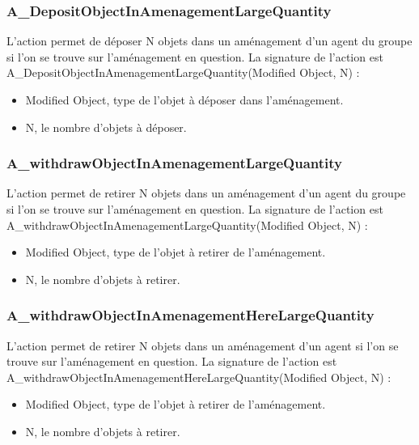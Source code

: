 \subsubsection{A\_DepositObjectInAmenagementLargeQuantity}

L'action permet de déposer N objets 	dans un aménagement d'un agent du groupe si l'on se trouve sur l'aménagement en question. 
La signature de l'action est A\_DepositObjectInAmenagementLargeQuantity(Modified Object, N) :
\begin{itemize}
\item Modified Object, type de l'objet à déposer dans l'aménagement.
\item N, le nombre d'objets à déposer.
\end{itemize}

\subsubsection{A\_withdrawObjectInAmenagementLargeQuantity}

L'action permet de retirer N objets dans un aménagement d'un agent du groupe si l'on se trouve sur l'aménagement en question. 
La signature de l'action est A\_withdrawObjectInAmenagementLargeQuantity(Modified Object, N) :
\begin{itemize}
\item Modified Object, type de l'objet à retirer de l'aménagement.
\item N, le nombre d'objets à retirer.
\end{itemize}

\subsubsection{A\_withdrawObjectInAmenagementHereLargeQuantity}

L'action permet de retirer N objets dans un aménagement d'un agent si l'on se trouve sur l'aménagement en question. 
La signature de l'action est A\_withdrawObjectInAmenagementHereLargeQuantity(Modified Object, N) :
\begin{itemize}
\item Modified Object, type de l'objet à retirer de l'aménagement.
\item N, le nombre d'objets à retirer.
\end{itemize}
